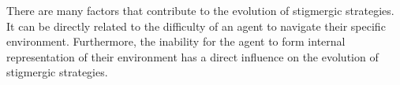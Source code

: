 There are many factors that contribute to the evolution of stigmergic strategies.
It can be directly related to the difficulty of an agent to navigate their specific environment.
Furthermore, the inability for the agent to form internal representation of their environment has a direct influence on the evolution of stigmergic strategies.
